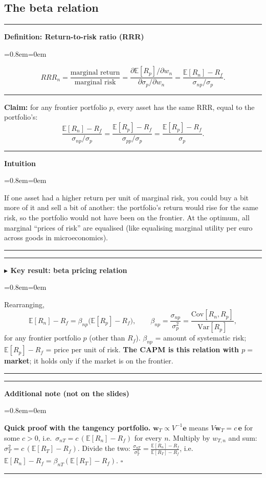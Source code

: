 \documentclass[11pt,a4paper]{report}
\newenvironment{notebox}[1]
  {\par\medskip\Needspace{6\baselineskip}\noindent\rule{\linewidth}{0.4pt}\par\nopagebreak
   \noindent\textbf{#1}\par\nopagebreak
   \begin{list}{}{\leftmargin=0.8em\rightmargin=0em\topsep=2pt}\item[]}
  {\end{list}\nopagebreak\noindent\rule{\linewidth}{0.4pt}\par\medskip}
\newenvironment{keybox}[1][]{\begin{notebox}{$\blacktriangleright$ Key result#1}}{\end{notebox}}
\newenvironment{definitionbox}[1]{\begin{notebox}{Definition: #1}}{\end{notebox}}
\newenvironment{intuition}{\begin{notebox}{Intuition}}{\end{notebox}}
\newenvironment{addnote}{\begin{notebox}{Additional note (not on the slides)}}{\end{notebox}}
\newcommand{\E}{\mathbb{E}}
\newcommand{\w}{\bm{w}}
\begin{document}
\subsection{The beta relation}
\begin{definitionbox}{Return-to-risk ratio (RRR)}
\[
RRR_n=\frac{\text{marginal return}}{\text{marginal risk}}=\frac{\partial\E[R_p]/\partial w_n}{\partial\sigma_p/\partial w_n}=\frac{\E[R_n]-R_f}{\sigma_{np}/\sigma_p}.
\]
\end{definitionbox}
\textbf{Claim:} for any frontier portfolio $p$, every asset has the same RRR, equal to the portfolio's:
\[
\frac{\E[R_n]-R_f}{\sigma_{np}/\sigma_p}=\frac{\E[R_p]-R_f}{\sigma_{pp}/\sigma_p}=\frac{\E[R_p]-R_f}{\sigma_p}.
\]
\begin{intuition}
If one asset had a higher return per unit of marginal risk, you could buy a
bit more of it and sell a bit of another: the portfolio's return would rise for
the same risk, so the portfolio would not have been on the frontier. At the
optimum, all marginal ``prices of risk'' are equalised (like equalising marginal
utility per euro across goods in microeconomics).
\end{intuition}
\begin{keybox}[: beta pricing relation]
Rearranging,
\[
\E[R_n]-R_f=\beta_{np}\big(\E[R_p]-R_f\big),\qquad \beta_{np}=\frac{\sigma_{np}}{\sigma_p^2}=\frac{\text{Cov}[R_n,R_p]}{\text{Var}[R_p]},
\]
for any frontier portfolio $p$ (other than $R_f$).
$\beta_{np}$ = amount of systematic risk; $\E[R_p]-R_f$ = price per unit of risk.
\textbf{The CAPM is this relation with $p=$ market}; it holds only if the market
is on the frontier.
\end{keybox}
\begin{addnote}
\textbf{Quick proof with the tangency portfolio.} $\w_T\propto V^{-1}\bm e$ means
$V\w_T=c\,\bm e$ for some $c>0$, i.e.\ $\sigma_{nT}=c\,(\E[R_n]-R_f)$ for every $n$.
Multiply by $w_{T,n}$ and sum: $\sigma_T^2=c\,(\E[R_T]-R_f)$. Divide the two:
$\frac{\sigma_{nT}}{\sigma_T^2}=\frac{\E[R_n]-R_f}{\E[R_T]-R_f}$, i.e.\
$\E[R_n]-R_f=\beta_{nT}(\E[R_T]-R_f)$. $\square$
\end{addnote}
\end{document}

